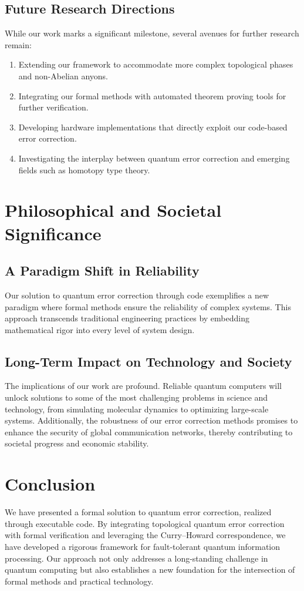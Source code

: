 \documentclass[12pt]{article}
\begin{document}
\subsection{Future Research Directions}
While our work marks a significant milestone, several avenues for further research remain:
\begin{enumerate}[label=(\alph*)]
    \item Extending our framework to accommodate more complex topological phases and non-Abelian anyons.
    \item Integrating our formal methods with automated theorem proving tools for further verification.
    \item Developing hardware implementations that directly exploit our code-based error correction.
    \item Investigating the interplay between quantum error correction and emerging fields such as homotopy type theory.
\end{enumerate}

\section{Philosophical and Societal Significance}
\subsection{A Paradigm Shift in Reliability}
Our solution to quantum error correction through code exemplifies a new paradigm where formal methods ensure the reliability of complex systems. This approach transcends traditional engineering practices by embedding mathematical rigor into every level of system design.

\subsection{Long-Term Impact on Technology and Society}
The implications of our work are profound. Reliable quantum computers will unlock solutions to some of the most challenging problems in science and technology, from simulating molecular dynamics to optimizing large-scale systems. Additionally, the robustness of our error correction methods promises to enhance the security of global communication networks, thereby contributing to societal progress and economic stability.

\section{Conclusion}
We have presented a formal solution to quantum error correction, realized through executable code. By integrating topological quantum error correction with formal verification and leveraging the Curry–Howard correspondence, we have developed a rigorous framework for fault-tolerant quantum information processing. Our approach not only addresses a long-standing challenge in quantum computing but also establishes a new foundation for the intersection of formal methods and practical technology.
\end{document}

